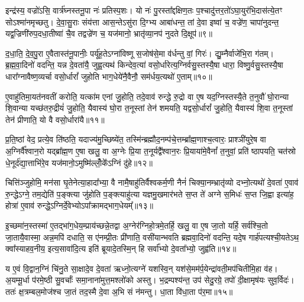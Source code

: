 {\anuvakamend[{प्रा॒जा॒प॒त्याल्लोँ॒काय॑ देवाः पितो दध्यादाग्रय॒णं पञ्च॑विꣳशतिश्च॥२॥}]}

इन्द्र॑स्य॒ वज्रो॑\-ऽसि॒ वार्त्र॑घ्नस्तनू॒पा नः॑ प्रतिस्प॒शः। यो नः॑ पु॒रस्ता᳚द्दक्षिण॒तः प॒श्चादु॑त्तर॒तो॑\-ऽघा॒युर॑भि॒दास॑त्ये॒तꣳ सो\-ऽश्मा॑नमृच्छतु। दे॒वा॒सु॒राः संय॑त्ता आस॒न्ते\-ऽसु॑रा दि॒ग्भ्य आबा॑धन्त॒ तां दे॒वा इष्वा॑ च॒ वज्रे॑ण॒ चापा॑नुदन्त॒ यद्व॒ज्रिणी॑रुप॒दधा॒तीष्वा॑ चै॒व तद्वज्रे॑ण च॒ यज॑मानो॒ भ्रातृ॑व्या॒नप॑ नुदते दि॒क्षूप॑॥९॥

द॒धा॒ति॒ दे॒व॒पु॒रा ए॒वैतास्त॑नू॒पानीः॒ पर्यू॑ह॒ते\-ऽग्ना॑विष्णू स॒जोष॑से॒मा व॑र्धन्तु वां॒ गिरः॑। द्यु॒म्नैर्वाजे॑भि॒रा ग॑तम्। ब्र॒ह्म॒वा॒दिनो॑ वदन्ति॒ यन्न दे॒वता॑यै॒ जुह्व॒त्यथ॑ किन्देव॒त्या॑ वसो॒र्धारेत्य॒ग्निर्वसु॒स्तस्यै॒षा धारा॒ विष्णु॒र्वसु॒स्तस्यै॒षा धारा᳚ग्नावैष्ण॒व्यर्चा वसो॒र्धारां᳚ जुहोति भाग॒धेये॑नै॒वैनौ॒ सम॑र्धय॒त्यथो॑ ए॒ताम्॥१०॥

ए॒वाहु॑तिमा॒यत॑नवतीं करोति॒ यत्का॑म एनां जु॒होति॒ तदे॒वाव॑ रुन्द्धे रु॒द्रो वा ए॒ष यद॒ग्निस्तस्यै॒ते त॒नुवौ॑ घो॒रान्या शि॒वान्या यच्छ॑तरु॒द्रीयं॑ जु॒होति॒ यैवास्य॑ घो॒रा त॒नूस्तां तेन॑ शमयति॒ यद्वसो॒र्धारां᳚ जु॒होति॒ यैवास्य॑ शि॒वा त॒नूस्तां तेन॑ प्रीणाति॒ यो वै वसो॒र्धारा॑यै॥११॥

प्र॒ति॒ष्ठां वेद॒ प्रत्ये॒व ति॑ष्ठति॒ यदाज्य॑मु॒च्छिष्ये॑त॒ तस्मि॑न्ब्रह्मौद॒नम्प॑चे॒त्तम्ब्रा᳚ह्म॒णाश्च॒त्वारः॒ प्राश्ञी॑युरे॒ष वा अ॒ग्निर्वै᳚श्वान॒रो यद्ब्रा᳚ह्म॒ण ए॒षा खलु॒ वा अ॒ग्नेः प्रि॒या त॒नूर्यद्वै᳚श्वान॒रः प्रि॒याया॑मे॒वैनां᳚ त॒नुवां॒ प्रति॑ ष्ठापयति॒ चत॑स्रो धे॒नूर्द॑द्या॒त्ताभि॑रे॒व यज॑मानो॒\-ऽमुष्मि॑ल्लोँ॒के᳚\-ऽग्निं दु॑हे॥१२॥

{\anuvakamend[{उपै॒तान्धारा॑यै॒ षट्च॑त्वारिꣳशच्च॥३॥}]}

चित्ति॑ञ्जुहोमि॒ मन॑सा घृ॒तेनेत्या॒हादा᳚भ्या॒ वै नामै॒षाहु॑तिर्वैश्वकर्म॒णी नैनं॑ चिक्या॒नम्भ्रातृ॑व्यो दभ्नो॒त्यथो॑ दे॒वता॑ ए॒वाव॑ रु॒न्द्धे\-ऽग्ने॒ तम॒द्येति॑ प॒ङ्क्त्या जु॑होति प॒ङ्क्त्याहु॑त्या यज्ञमु॒खमार॑भते स॒प्त ते॑ अग्ने स॒मिधः॑ स॒प्त जि॒ह्वा इत्या॑ह॒ होत्रा॑ ए॒वाव॑ रुन्द्धे॒\-ऽग्निर्दे॒वेभ्यो\-ऽपा᳚क्रामद्भाग॒धेयम्᳚॥१३॥

इ॒च्छमा॑न॒स्तस्मा॑ ए॒तद्भा॑ग॒धेय॒म्प्राय॑च्छन्ने॒तद्वा अ॒ग्नेर॑ग्निहो॒त्रमे॒तर्\mbox{}हि॒ खलु॒ वा ए॒ष जा॒तो यर्\mbox{}हि॒ सर्व॑श्चि॒तो जा॒तायै॒वास्मा॒ अन्न॒मपि॑ दधाति॒ स ए॑नम्प्री॒तः प्री॑णाति॒ वसी॑यान्भवति ब्रह्मवा॒दिनो॑ वदन्ति॒ यदे॒ष गार्\mbox{}ह॑पत्यश्ची॒यते\-ऽथ॒ क्वा᳚स्याहव॒नीय॒ इत्य॒सावा॑दि॒त्य इति॑ ब्रूयादे॒तस्मि॒न् हि सर्वा᳚भ्यो दे॒वता᳚भ्यो॒ जुह्व॑ति॥१४॥

य ए॒वं वि॒द्वान॒ग्निं चि॑नु॒ते सा॒क्षादे॒व दे॒वता॑ ऋध्नो॒त्यग्ने॑ यशस्वि॒न् यश॑से॒मम॑र्प॒येन्द्रा॑वती॒मप॑चितीमि॒हा व॑ह। अ॒यम्मू॒र्धा प॑रमे॒ष्ठी सु॒वर्चाः᳚ समा॒नाना॑मुत्त॒मश्लो॑को अस्तु। भ॒द्रम्पश्य॑न्त॒ उप॑ सेदु॒रग्रे॒ तपो॑ दी॒क्षामृष॑यः सुव॒र्विदः॑। ततः॑ क्ष॒त्रम्बल॒मोज॑श्च जा॒तं तद॒स्मै दे॒वा अ॒भि सं न॑मन्तु। धा॒ता वि॑धा॒ता प॑र॒मा॥१५॥

